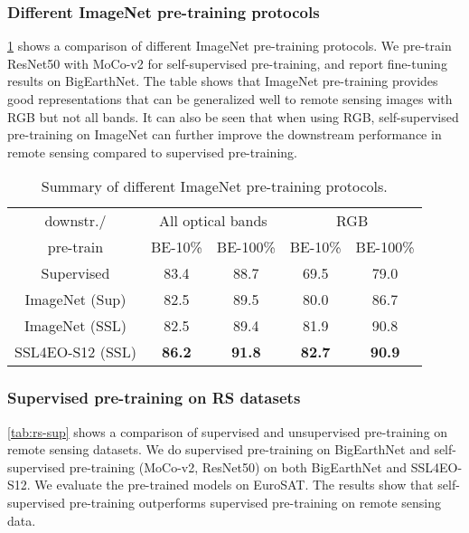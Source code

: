 \documentclass[lettersize,journal]{IEEEtran}
\begin{document}
\subsubsection{Different ImageNet pre-training protocols} \cref{tab:imagenet-diff} shows a comparison of different ImageNet pre-training protocols. We pre-train ResNet50 with MoCo-v2 for self-supervised pre-training, and report fine-tuning results on BigEarthNet. The table shows that ImageNet pre-training provides good representations that can be generalized well to remote sensing images with RGB but not all bands. It can also be seen that when using RGB, self-supervised pre-training on ImageNet can further improve the downstream performance in remote sensing compared to supervised pre-training.



\begin{table}[h!]
\caption{Summary of different ImageNet pre-training protocols.}
\label{tab:imagenet-diff}
\centering
\begin{tabular}{ccccc}
\hline
downstr./               & \multicolumn{2}{c}{All optical bands} & \multicolumn{2}{c}{RGB}       \\
pre-train               & BE-10\%           & BE-100\%          & BE-10\%       & BE-100\%      \\ \hline \hline
Supervised     & 83.4              & 88.7              & 69.5          & 79.0          \\
ImageNet (Sup) & 82.5              & 89.5              & 80.0          & 86.7          \\
ImageNet (SSL) & 82.5              & 89.4              & 81.9          & 90.8          \\
SSL4EO-S12 (SSL)     & \textbf{86.2}     & \textbf{91.8}     & \textbf{82.7} & \textbf{90.9} \\ \hline
\end{tabular}
\end{table}



\subsubsection{\textbf{Supervised pre-training on RS datasets}}
\cref{tab:rs-sup} shows a comparison of supervised and unsupervised pre-training on remote sensing datasets. We do supervised pre-training on BigEarthNet and self-supervised pre-training (MoCo-v2, ResNet50) on both BigEarthNet and SSL4EO-S12. We evaluate the pre-trained models on EuroSAT. The results show that self-supervised pre-training outperforms supervised pre-training on remote sensing data.
\end{document}
